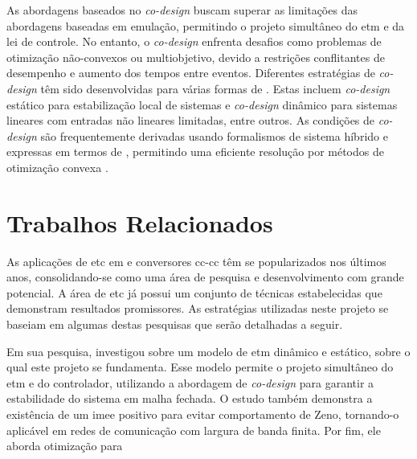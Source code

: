 As abordagens baseados no \textit{co-design} buscam superar as limitações das abordagens baseadas em emulação, permitindo o projeto simultâneo do \acrshort{etm} e da lei de controle. No entanto, o \textit{co-design} enfrenta desafios como problemas de otimização não-convexos ou multiobjetivo, devido a restrições conflitantes de desempenho e aumento dos tempos entre eventos. Diferentes estratégias de \textit{co-design} têm sido desenvolvidas para várias formas de . Estas incluem \textit{co-design} estático para estabilização local de sistemas  e \textit{co-design} dinâmico para sistemas lineares com entradas não lineares limitadas, entre outros. As condições de \textit{co-design} são frequentemente derivadas usando formalismos de sistema híbrido e expressas em termos de , permitindo uma eficiente resolução por métodos de otimização convexa \citep{coutinho2021}.

\section{Trabalhos Relacionados}

As aplicações de \acrshort{etc} em  e conversores \acrshort{cc}-\acrshort{cc} têm se popularizados nos últimos anos, consolidando-se como uma área de pesquisa e desenvolvimento com grande potencial. A área de \acrshort{etc} já possui um conjunto de técnicas estabelecidas que demonstram resultados promissores. As estratégias utilizadas neste projeto se baseiam em algumas destas pesquisas que serão detalhadas a seguir.

Em sua pesquisa, \cite{coutinho2021} investigou sobre um modelo de \acrshort{etm} dinâmico e estático, sobre o qual este projeto se fundamenta. Esse modelo permite o projeto simultâneo do \acrshort{etm} e do controlador, utilizando a abordagem de \textit{co-design} para garantir a estabilidade do sistema em malha fechada. O estudo também demonstra a existência de um \acrfull{imee} positivo para evitar comportamento de Zeno, tornando-o aplicável em redes de comunicação com largura de banda finita. Por fim, ele aborda otimização para 

